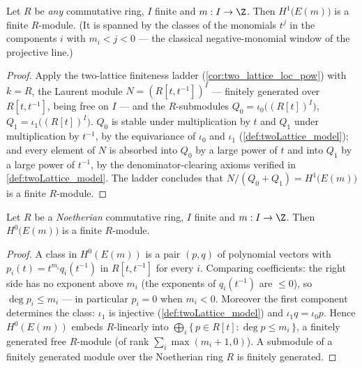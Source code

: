 \begin{theorem}
  \label{thm:moduleFinite_h1_model}
  \leanok
  Let \(R\) be \emph{any} commutative ring, \(I\) finite and \(m : I \to \Z\). Then
  \(H^1\bigl(E(m)\bigr)\) is a finite \(R\)-module. (It is spanned by the classes of
  the monomials \(t^j\) in the components \(i\) with \(m_i < j < 0\) --- the classical
  negative-monomial window of the projective line.)
\end{theorem}
\begin{proof}
  \leanok
  Apply the two-lattice finiteness ladder (\ref{cor:two_lattice_loc_pow}) with
  \(k = R\), the Laurent module \(N = (R[t,t^{-1}])^I\) --- finitely generated over
  \(R[t,t^{-1}]\), being free on \(I\) --- and the \(R\)-submodules
  \(Q_0 = \iota_0\bigl((R[t])^I\bigr)\), \(Q_1 = \iota_1\bigl((R[t])^I\bigr)\). \(Q_0\)
  is stable under multiplication by \(t\) and \(Q_1\) under multiplication by
  \(t^{-1}\), by the equivariance of \(\iota_0\) and \(\iota_1\)
  (\ref{def:twoLattice_model}); and every element of \(N\) is absorbed into \(Q_0\) by
  a large power of \(t\) and into \(Q_1\) by a large power of \(t^{-1}\), by the
  denominator-clearing axioms verified in \ref{def:twoLattice_model}. The ladder
  concludes that \(N/(Q_0 + Q_1) = H^1\bigl(E(m)\bigr)\) is a finite \(R\)-module.
\end{proof}

\begin{theorem}
  \label{thm:moduleFinite_h0_model}
  \leanok
  Let \(R\) be a \emph{Noetherian} commutative ring, \(I\) finite and \(m : I \to \Z\).
  Then \(H^0\bigl(E(m)\bigr)\) is a finite \(R\)-module.
\end{theorem}
\begin{proof}
  \leanok
  A class in \(H^0(E(m))\) is a pair \((p, q)\) of polynomial vectors with
  \(p_i(t) = t^{m_i} q_i(t^{-1})\) in \(R[t,t^{-1}]\) for every \(i\). Comparing
  coefficients: the right side has no exponent above \(m_i\) (the exponents of
  \(q_i(t^{-1})\) are \(\le 0\)), so \(\deg p_i \le m_i\) --- in particular \(p_i = 0\)
  when \(m_i < 0\). Moreover the first component determines the class: \(\iota_1\) is
  injective (\ref{def:twoLattice_model}) and \(\iota_1 q = \iota_0 p\). Hence
  \(H^0(E(m))\) embeds \(R\)-linearly into
  \(\bigoplus_{i} \{\, p \in R[t] : \deg p \le m_i \,\}\), a finitely generated free
  \(R\)-module (of rank \(\sum_i \max(m_i + 1, 0)\)). A submodule of a finitely
  generated module over the Noetherian ring \(R\) is finitely generated.
\end{proof}

